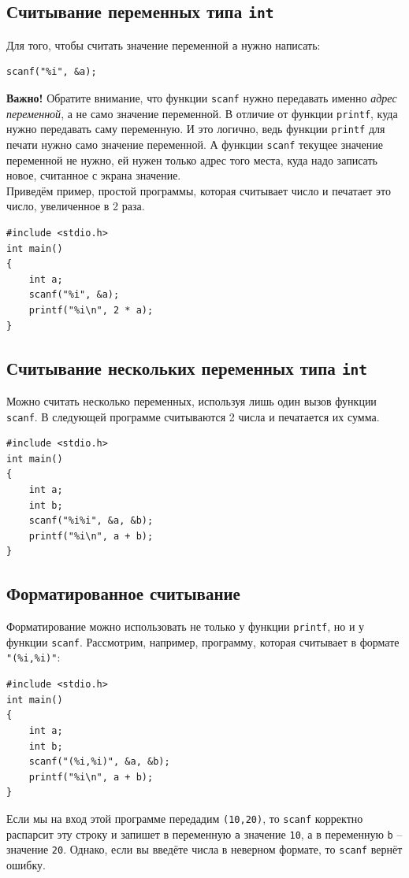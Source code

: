 \documentclass[10pt]{article}
\begin{document}
\subsection*{Считывание переменных типа \texttt{int}}
Для того, чтобы считать значение переменной \texttt{a} нужно написать:
\begin{lstlisting}
scanf("%i", &a);
\end{lstlisting}
\textbf{Важно!} Обратите внимание, что функции \texttt{scanf} нужно передавать именно \textit{адрес переменной}, а не само значение переменной. В отличие от функции \texttt{printf}, куда нужно передавать саму переменную. 
И это логично, ведь функции \texttt{printf} для печати нужно само значение переменной.
А функции \texttt{scanf} текущее значение переменной не нужно, ей нужен только адрес того места, куда надо записать новое, считанное с экрана значение.\\
\noindent Приведём пример, простой программы, которая считывает число и печатает это число, увеличенное в 2 раза.
\begin{lstlisting}
#include <stdio.h>
int main()
{
    int a;
    scanf("%i", &a);
    printf("%i\n", 2 * a);
}
\end{lstlisting}

\subsection*{Считывание нескольких переменных типа \texttt{int}}
Можно считать несколько переменных, используя лишь один вызов функции \texttt{scanf}. В следующей программе считываются 2 числа и печатается их сумма.
\begin{lstlisting}
#include <stdio.h>
int main()
{
    int a;
    int b;
    scanf("%i%i", &a, &b);
    printf("%i\n", a + b);
}
\end{lstlisting}

\subsection*{Форматированное считывание}
Форматирование можно использовать не только у функции \texttt{printf}, но и у функции \texttt{scanf}.
Рассмотрим, например, программу, которая считывает в формате \texttt{"(\%i,\%i)"}:
\begin{lstlisting}
#include <stdio.h>
int main()
{
    int a;
    int b;
    scanf("(%i,%i)", &a, &b);
    printf("%i\n", a + b);
}
\end{lstlisting}
Если мы на вход этой программе передадим \texttt{(10,20)}, то \texttt{scanf} корректно распарсит эту строку и запишет в переменную \texttt{a} значение \texttt{10}, а в переменную \texttt{b} -- значение \texttt{20}. Однако, если вы введёте числа в неверном формате, то \texttt{scanf} вернёт ошибку.
\end{document}
